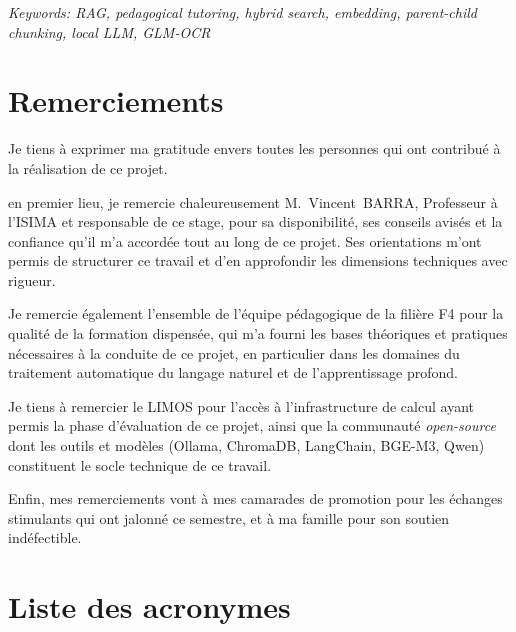 \documentclass[11pt,a4paper]{article}
\begin{document}
\textit{Keywords: RAG, pedagogical tutoring, hybrid search, embedding, parent-child chunking, local LLM, GLM-OCR}

\section*{Remerciements}

Je tiens à exprimer ma gratitude envers toutes les personnes qui ont contribué à la réalisation de ce projet.

en premier lieu, je remercie chaleureusement M.~Vincent~BARRA, Professeur à l'ISIMA et responsable de ce stage, pour sa disponibilité, ses conseils avisés et la confiance qu'il m'a accordée tout au long de ce projet. Ses orientations m'ont permis de structurer ce travail et d'en approfondir les dimensions techniques avec rigueur.

Je remercie également l'ensemble de l'équipe pédagogique de la filière F4 pour la qualité de la formation dispensée, qui m'a fourni les bases théoriques et pratiques nécessaires à la conduite de ce projet, en particulier dans les domaines du traitement automatique du langage naturel et de l'apprentissage profond.

Je tiens à remercier le LIMOS pour l'accès à l'infrastructure de calcul ayant permis la phase d'évaluation de ce projet, ainsi que la communauté \textit{open-source} dont les outils et modèles (Ollama, ChromaDB, LangChain, BGE-M3, Qwen) constituent le socle technique de ce travail.

Enfin, mes remerciements vont à mes camarades de promotion pour les échanges stimulants qui ont jalonné ce semestre, et à ma famille pour son soutien indéfectible.

\section*{Liste des acronymes}
\end{document}
